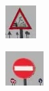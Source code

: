 \begin{figure}[h]
\begin{subfigure}[b]{0.15\linewidth}
      \includegraphics[width=\linewidth]{figures/signs/LooseRoad.jpg}
    \caption{}
  \end{subfigure}
  \begin{subfigure}[b]{0.15\linewidth}
      \includegraphics[width=\linewidth]{figures/signs/NoEntry.jpg}

\end{subfigure}
\end{figure}
